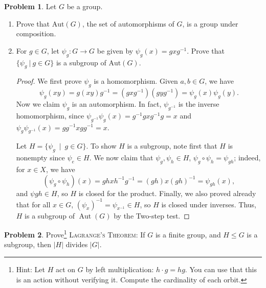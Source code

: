 \documentclass[11pt]{article}
\theoremstyle{definition}
\newtheorem{problem}{Problem}
\begin{document}
\begin{problem} Let $G$ be a group.
\begin{enumerate}[(4.1)]
\item Prove that $\mathrm{Aut}(G)$, the set of automorphisms of $G$, is a group under composition.



\item For $g\in G$, let $\psi_g: G\to G$ be given by $\psi_g(x) = gxg^{-1}$. Prove that $\{ \psi_g \ | \ g\in G\}$ is a subgroup of $\mathrm{Aut}(G)$. 

\begin{proof}
We first prove $\psi_g$ is a homomorphism. Given $a,b\in G$, we have
$$\psi_g(xy)=g(xy)g^{-1}=(gxg^{-1})(gyg^{-1})=\psi_g(x)\psi_g(y).$$ 
Now we claim $\psi_g$ is an automorphism. In fact, $\psi_{g^{-1}}$ is the inverse homomorphism, since $\psi_{g^{-1}}\psi_{g}(x) = g^{-1} g x g^{-1} g = x$ and $\psi_{g}\psi_{g^{-1}}(x) = g g^{-1}  x g g^{-1} = x$.

Let $H=\{\psi_g \ \mid \ g\in G\}$. To show $H$ is a subgroup, note first that $H$ is nonempty since $\psi_e \in H$. We now claim that $\psi_g, \psi_h\in H$, $\psi_g\circ \psi_h=\psi_{gh}$; indeed, for $x\in X$, we have
\[ (\psi_g\circ \psi_h)(x) = g h x h^{-1} g^{-1} = (gh) x (gh)^{-1} = \psi_{gh}(x),\]
and $\psi{gh}\in H$, so $H$ is closed for the product.  Finally, we also proved already that for all $x\in G$,  $(\psi_x)^{-1}=\psi_{x^{-1}}\in H$, so $H$ is closed under inverses.  Thus, $H$ is a subgroup of $\operatorname{Aut}(G)$ by the Two-step test.
\end{proof}
\end{enumerate}
\end{problem}

\begin{problem} Prove\footnote{Hint: Let $H$ act on $G$ by left multiplication: $h \cdot g= hg$. You can use that this is an action without verifying it. Compute the cardinality of each orbit.} \textsc{Lagrange's Theorem:} If $G$ is a finite group, and $H\leq G$ is a subgroup, then $|H|$ divides $|G|$. 
\end{problem}
\end{document}
